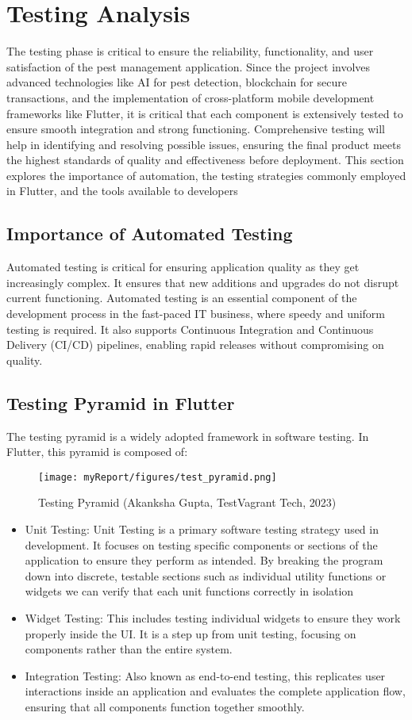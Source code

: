 \section{Testing Analysis}
The testing phase is critical to  ensure the reliability, functionality, and user satisfaction of the pest management application. Since the project involves advanced technologies like AI for pest detection, blockchain for secure transactions, and the implementation of cross-platform mobile development frameworks like Flutter, it is critical that each component is extensively tested to ensure smooth integration and strong functioning. Comprehensive testing will help in identifying and resolving possible issues, ensuring the final product meets the highest standards of quality and effectiveness before deployment. This section explores the importance of automation, the testing strategies commonly employed in Flutter, and the tools available to developers \cite{testing_analysis}

\subsection{Importance of Automated Testing}
Automated testing is critical for ensuring application quality as they get increasingly complex. It ensures that new additions and upgrades do not disrupt current functioning. Automated testing is an essential component of the development process in the fast-paced IT business, where speedy and uniform testing is required. It also supports Continuous Integration and Continuous Delivery (CI/CD) pipelines, enabling rapid releases without compromising on quality.

\subsection{Testing Pyramid in Flutter}
The testing pyramid is a widely adopted framework in software testing. In Flutter, this pyramid is composed of:
\begin{figure}[ht]
\texttt{[image: myReport/figures/test\_pyramid.png]}
\caption{Testing Pyramid (Akanksha Gupta, TestVagrant Tech, 2023)}
\end{figure}

\begin{itemize}
    \item Unit Testing: Unit Testing is a primary software testing strategy used in development. It focuses on testing specific components or sections of the application to ensure they perform as intended. By breaking the program down into discrete, testable sections such as individual utility functions or widgets we can verify that each unit functions correctly in isolation
    \item Widget Testing: This includes testing individual widgets to ensure they work properly inside the UI. It is a step up from unit testing, focusing on components rather than the entire system.
    \item Integration Testing: Also known as end-to-end testing, this replicates user interactions inside an application and evaluates the complete application flow, ensuring that all components function together smoothly. 
\end{itemize}


